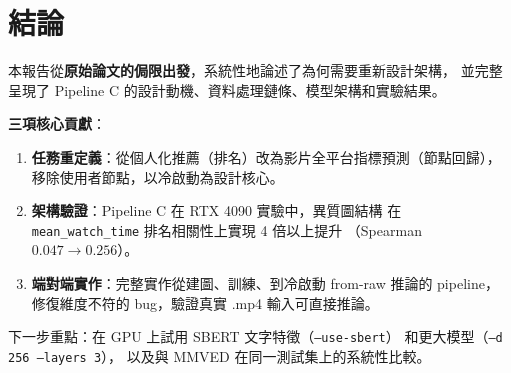\documentclass[12pt, a4paper]{article}
\begin{document}
\section{結論}
\label{sec:conclusion}

本報告從\textbf{原始論文的侷限出發}，系統性地論述了為何需要重新設計架構，
並完整呈現了 Pipeline C 的設計動機、資料處理鏈條、模型架構和實驗結果。

\textbf{三項核心貢獻}：
\begin{enumerate}
\item \textbf{任務重定義}：從個人化推薦（排名）改為影片全平台指標預測（節點回歸），
  移除使用者節點，以冷啟動為設計核心。
\item \textbf{架構驗證}：Pipeline C 在 RTX 4090 實驗中，異質圖結構
  在 \texttt{mean\_watch\_time} 排名相關性上實現 4 倍以上提升
  （Spearman $0.047 \to 0.256$）。
\item \textbf{端對端實作}：完整實作從建圖、訓練、到冷啟動 from-raw 推論的 pipeline，
  修復維度不符的 bug，驗證真實 .mp4 輸入可直接推論。
\end{enumerate}

下一步重點：在 GPU 上試用 SBERT 文字特徵（\texttt{--use-sbert}）
和更大模型（\texttt{--d 256 --layers 3}），
以及與 MMVED 在同一測試集上的系統性比較。
\end{document}
